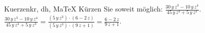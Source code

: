 \begin{MAufgabe}{Kuerzen}{kr, dh, MaTeX}
K\"urzen Sie soweit m\"oglich: $\frac{30\, y\, z^3 - 10\, y\, z^4}{45\, y\, z^4 + 5\, y\, z^3}$.\\ 
\ifLsg\MLoesung
\quad $\frac{30\, y\, z^3 - 10\, y\, z^4}{45\, y\, z^4 + 5\, y\, z^3}=\frac{(5\, y\, z^3)\cdot(6 - 2\, z)}{(5\, y\, z^3)\cdot(9\, z + 1)}=\frac{6 - 2\, z}{9\, z + 1}$.\else\relax\fi
 \end{MAufgabe}